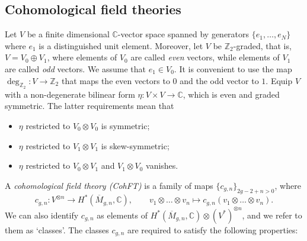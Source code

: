 \documentclass{amsart}
\numberwithin{equation}{section} %
\theoremstyle{plain}
\theoremstyle{remark}
\begin{document}
\subsection{Cohomological field theories}
\label{section: CohFT}
Let $V$ be a finite dimensional $\mathbb{C}$-vector space spanned by generators $\{e_1,\ldots,e_N\}$ where $e_1$ is a distinguished unit element. Moreover, let $V$ be $\mathbb{Z}_2$-graded, that is, $V=V_0\oplus V_1$, where elements of $V_0$ are called \textit{even} vectors, while elements of $V_1$ are called \textit{odd} vectors. We assume that $e_1\in V_0$. It is convenient to use the map $\deg_{\mathbb{Z}_2}\colon V \to \mathbb{Z}_2$ that maps the even vectors to $0$ and the odd vector to $1$. Equip $V$ with a non-degenerate bilinear form $\eta:V\times V \rightarrow \mathbb{C}$, which is even and graded symmetric. The latter requirements mean that
\begin{itemize}
    \item $\eta$ restricted to $V_0\otimes V_0$ is symmetric;
    \item $\eta$ restricted to $V_1\otimes V_1$ is skew-symmetric;
    \item $\eta$ restricted to $V_0\otimes V_1$ and $V_1\otimes V_0$ vanishes. 
\end{itemize}
A \textit{cohomological field theory (CohFT)} is a family of maps $\{c_{g,n}\}_{2g-2+n>0}$, where
\begin{equation} \label{eq:definition-CohFT-cgn}
c_{g,n}\colon V^{\otimes n}\rightarrow H^{*}(\overline{M}_{g,n},\mathbb{C}), \qquad 
v_1\otimes \dots \otimes v_n \mapsto c_{g,n}(v_1\otimes \dots \otimes v_n).
\end{equation}
We can also identify $c_{g,n}$ as elements of $H^{*}(\overline{M}_{g,n},\mathbb{C})\otimes  (V^*)^{\otimes n}$, and we refer to them as `classes'. The classes $c_{g,n}$ are required to satisfy the following properties: 
﻿
\end{document}
